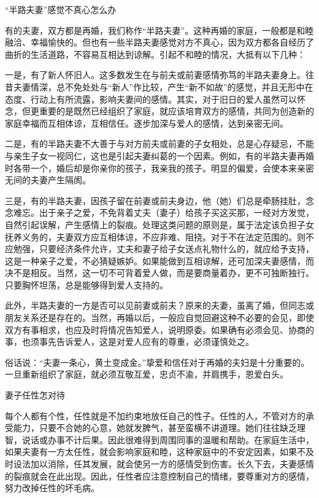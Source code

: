 \documentclass[12pt,UTF8,openany]{ctexbook}
\begin{document}
“半路夫妻”感觉不真心怎么办


有的夫妻，双方都是再婚，我们称作“半路夫妻”。这种再婚的家庭，一般都是和睦融洽、幸福愉快的。但也有一些半路夫妻感觉对方不真心，因为双方都各自经历了曲折的生活道路，不容易互相达到谅解。引起不和睦的情况，大抵有以下几种：

一是，有了新人怀旧人。这多数发生在与前夫或前妻感情弥笃的半路夫妻身上。往昔夫妻情深，总不免处处与“新人”作比较，产生“新不如故”的感觉，并且无形中在态度、行动上有所流露，影响夫妻间的感情。其实，对于旧日的爱人虽然可以怀念，但更重要的是既然已经组织了家庭，就应该培育双方的感情，共同为创造新的家庭幸福而互相体谅，互相信任。逐步加深与爱人的感情，达到亲密无间。

二是，有的半路夫妻不大善于与对方前夫或前妻的子女相处，总是心存疑忌，不能与亲生子女一视同仁，这也是引起夫妻纠葛的一个因素。例如，有的半路夫妻再婚时各带一个，婚后却是你亲你的孩子，我亲我的孩子。明显的偏爱，会使本来亲密无间的夫妻产生隔阂。

三是，有的半路夫妻，因孩子留在前妻或前夫身边，他（她）们总是牵肠挂肚，念念难忘。出于亲子之爱，不免背着丈夫（妻子）给孩子买这买那，一经对方发觉，自然引起误解，产生感情上的裂痕。处理这类问题的原则是，属于法定该负担子女抚养义务的，夫妻双方应互相体谅，不应非难、阻挠。对于不在法定范围的。则不应勉强，只要经济条件允许，丈夫和妻子给子女送点礼物什么的，就应给予支持，这是一种亲子之爱，不必猜疑嫉妒。如果能做到互相谅解，还可加深夫妻感情，而决不是相反。当然，这一切不可背着爱人做，而是要商量着办，更不可独断独行。只要胸怀坦荡，总是能够得到爱人支持的。

此外，半路夫妻的一方是否可以见前妻或前夫？原来的夫妻，虽离了婚，但同志或朋友关系还是存在的。当然，再婚以后，一般应自觉回避这种不必要的会见，即使双方有事相求，也应及时将情况告知爱人，说明原委。如果确有必须会见、协商的事，也须事先告诉爱人，这是对爱人应有的尊重，必须谨慎处之。

俗话说：“夫妻一条心，黄土变成金。”挚爱和信任对于再婚的夫妇是十分重要的。一旦重新组织了家庭，就必须互敬互爱，忠贞不渝，并肩携手，恩爱白头。





妻子任性怎对待


每个人都有个性，任性就是不加约束地放任自己的性子。任性的人，不管对方的承受能力，只要不合她的心意，她就发脾气，甚至蛮横不讲道理。她们往往缺乏理智，说话或办事不计后果。因此很难得到周围同事的温暖和帮助。在家庭生活中，如果夫妻有一方太任性，就会影响家庭和睦，这种家庭中的不安定因素，如果不及时设法加以消除，任其发展，就会使另一方的感情受到伤害。长久下去，夫妻感情的裂痕就会在此出现。因此，任性者应注意控制自己的情绪，要尊重对方的感情，努力改掉任性的坏毛病。
\end{document}
